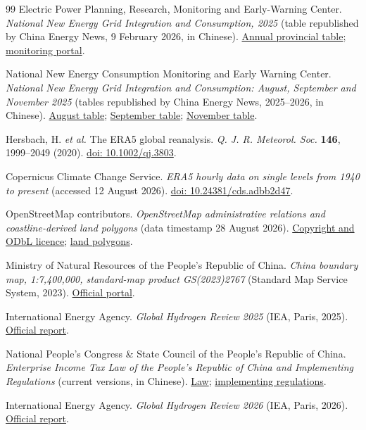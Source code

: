 \documentclass[11pt,a4paper]{article}
\begin{document}
\begin{thebibliography}{99}
Electric Power Planning, Research, Monitoring and Early-Warning Center. \emph{National New Energy Grid Integration and Consumption, 2025} (table republished by China Energy News, 9 February 2026, in Chinese). \href{https://epaper.ceic.com/pad/content/202602/09/content_20205.html}{Annual provincial table}; \href{https://www.xnyxnyj.cn/}{monitoring portal}.

National New Energy Consumption Monitoring and Early Warning Center. \emph{National New Energy Grid Integration and Consumption: August, September and November 2025} (tables republished by China Energy News, 2025--2026, in Chinese). \href{https://epaper.ceic.com/pc/attachment/202510/13/26e6af76-e1b7-40fb-b126-bc59f391e51c.pdf}{August table}; \href{https://epaper.ceic.com/pc/attachment/202511/07/6063762d-43ea-41fc-a37d-5f5549f62a5d.pdf}{September table}; \href{https://epaper.ceic.com/pc/attachment/202601/12/bf2a9f58-b724-435d-8c46-447e3ebbdc3d.pdf}{November table}.

Hersbach, H. \emph{et al.} The ERA5 global reanalysis. \emph{Q. J. R. Meteorol. Soc.} \textbf{146}, 1999--2049 (2020). \href{https://doi.org/10.1002/qj.3803}{doi: 10.1002/qj.3803}.

Copernicus Climate Change Service. \emph{ERA5 hourly data on single levels from 1940 to present} (accessed 12 August 2026). \href{https://doi.org/10.24381/cds.adbb2d47}{doi: 10.24381/cds.adbb2d47}.

OpenStreetMap contributors. \emph{OpenStreetMap administrative relations and coastline-derived land polygons} (data timestamp 28 August 2026). \href{https://www.openstreetmap.org/copyright}{Copyright and ODbL licence}; \href{https://osmdata.openstreetmap.de/data/land-polygons.html}{land polygons}.

Ministry of Natural Resources of the People's Republic of China. \emph{China boundary map, 1:7,400,000, standard-map product GS(2023)2767} (Standard Map Service System, 2023). \href{http://bzdt.ch.mnr.gov.cn/}{Official portal}.

International Energy Agency. \emph{Global Hydrogen Review 2025} (IEA, Paris, 2025). \href{https://www.iea.org/reports/global-hydrogen-review-2025}{Official report}.

National People's Congress \& State Council of the People's Republic of China. \emph{Enterprise Income Tax Law of the People's Republic of China and Implementing Regulations} (current versions, in Chinese). \href{https://flk.npc.gov.cn/detail?id=ff8080816f135f46016f2106acd11784}{Law}; \href{https://policy.mofcom.gov.cn/claw/clawContent.shtml?id=102338}{implementing regulations}.

International Energy Agency. \emph{Global Hydrogen Review 2026} (IEA, Paris, 2026). \href{https://www.iea.org/reports/global-hydrogen-review-2026}{Official report}.

\end{thebibliography}
\end{document}
